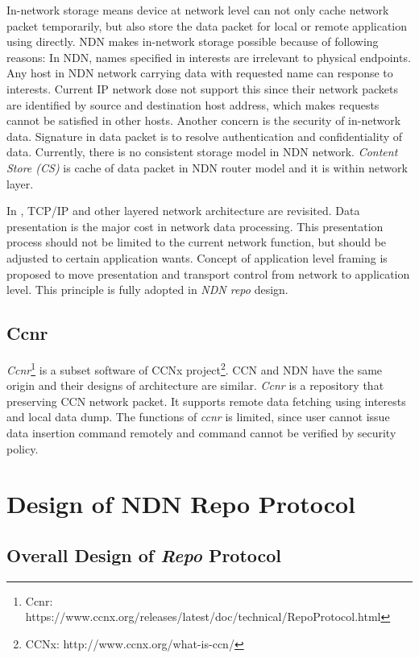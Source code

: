 \documentclass[conference]{IEEEtran}
\begin{document}
In-network storage means device at network level can not only cache network packet temporarily, but also store the data packet for local or remote application using directly. NDN makes in-network storage possible because of following reasons: In NDN, names specified in interests are irrelevant to physical endpoints. Any host in NDN network carrying data with requested name can response to interests. Current IP network dose not support this since their network packets are identified by source and destination host address, which makes requests cannot be satisfied in other hosts. Another concern is the security of in-network data. Signature in data packet is to resolve authentication and confidentiality of data. Currently, there is no consistent storage model in NDN network. \emph{Content Store (CS)} is cache of data packet in NDN router model and it is within network layer.

In \cite{clark1990architectural}, TCP/IP and other layered network architecture are revisited. Data presentation is the major cost in network data processing. This presentation process should not be limited to the current network function, but should be adjusted to certain application wants. Concept of application level framing is proposed to move presentation and transport control from network to application level. This principle is fully adopted in \emph{NDN repo} design.

\subsection{Ccnr}

\emph{Ccnr}\footnote{Ccnr: https://www.ccnx.org/releases/latest/doc/technical/RepoProtocol.html} is a subset software of CCNx project\footnote{CCNx: http://www.ccnx.org/what-is-ccn/}. CCN and NDN have the same origin and their designs of architecture are similar. \emph{Ccnr} is a repository that preserving CCN network packet. It supports remote data fetching using interests and local data dump. The functions of \emph{ccnr} is limited, since user cannot issue data insertion command remotely and command cannot be verified by security policy.

\section{Design of NDN Repo Protocol} \label{section-design}

\subsection{Overall Design of \emph{Repo} Protocol}
\end{document}

